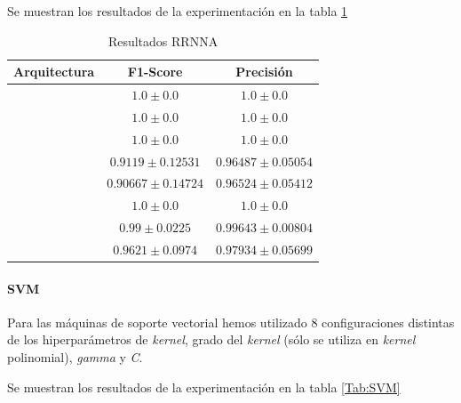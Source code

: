 \documentclass[12pt]{article}
\begin{document}
Se muestran los resultados de la experimentación en la tabla \ref{Tab:ANN}

\begin{table}[ht]
	\caption{Resultados RRNNA}
	\centering
		 \begin{tabular}{||c c c||}
			 \hline
			 Arquitectura & F1-Score & Precisión  \\ [0.5ex]
			 \hline\hline
			 [2] & $1.0 \pm 0.0$ & $1.0 \pm 0.0$ \\
			 \hline
			 [4] & $1.0 \pm 0.0$ & $1.0 \pm 0.0$ \\
			 \hline
			 [8] & $1.0 \pm 0.0$ & $1.0 \pm 0.0$ \\
			 \hline
			 [2, 4] & $0.9119 \pm 0.12531$ & $0.96487 \pm 0.05054$ \\
			 \hline
			 [2, 8] & $0.90667 \pm 0.14724$ & $0.96524 \pm 0.05412$ \\
			 \hline
			 [4, 2] & $1.0 \pm 0.0$ & $1.0 \pm 0.0$ \\
			 \hline
			 [4, 4] & $0.99 \pm 0.0225$ & $0.99643 \pm 0.00804$ \\
			 \hline
			 [4, 8] & $0.9621 \pm 0.0974$ & $0.97934 \pm 0.05699$ \\
			 \hline
		 \end{tabular}
	\label{Tab:ANN}
\end{table}

\paragraph{SVM}

Para las máquinas de soporte vectorial hemos utilizado 8 configuraciones distintas de los hiperparámetros de \textit{kernel},
grado del \textit{kernel} (sólo se utiliza en \textit{kernel} polinomial), \textit{gamma} y \textit{C}.

Se muestran los resultados de la experimentación en la tabla \ref{Tab:SVM}
\end{document}
